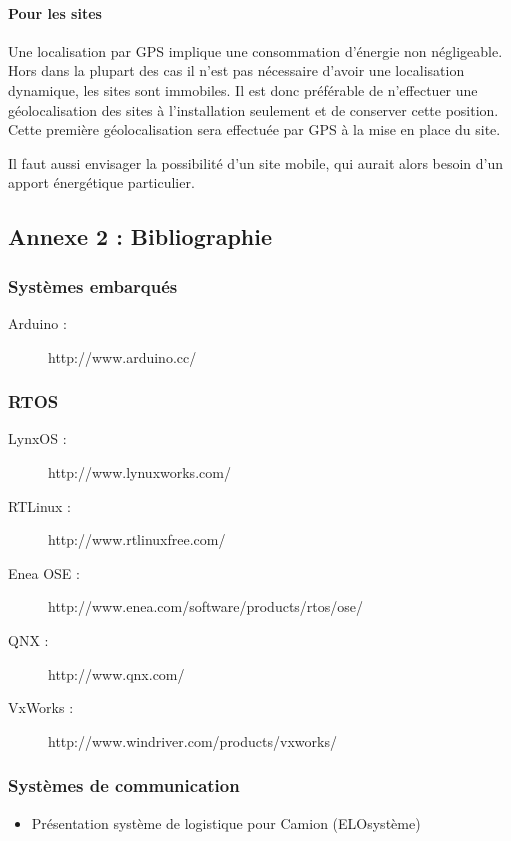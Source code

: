 \documentclass{mise_en_page}
\begin{document}
\paragraph{Pour les sites}
Une localisation par GPS implique une consommation d’énergie non
négligeable. Hors dans la plupart des cas il n’est pas nécessaire
d’avoir une localisation dynamique, les sites sont immobiles. Il est
donc préférable de n’effectuer une géolocalisation des sites à
l’installation seulement et de conserver cette position. Cette première
géolocalisation sera effectuée par GPS à la mise en place du site.

Il faut aussi envisager la possibilité d’un site mobile, qui aurait
alors besoin d’un apport énergétique particulier.


\subsection{Annexe 2 : Bibliographie}
\subsubsection{Systèmes embarqués}
\begin{description}
\item[Arduino :] http://www.arduino.cc/
\end{description}
\subsubsection{RTOS}
\begin{description}
\item[LynxOS :] http://www.lynuxworks.com/
\item[RTLinux :] http://www.rtlinuxfree.com/
\item[Enea OSE :] http://www.enea.com/software/products/rtos/ose/
\item[QNX :] http://www.qnx.com/
\item[VxWorks :] http://www.windriver.com/products/vxworks/
\end{description}

\subsubsection{Systèmes de communication}
\begin{itemize}
\item Présentation système de logistique pour Camion (ELOsystème)
\end{itemize}
\end{document}
